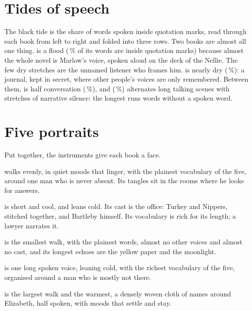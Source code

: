\clearpage
\section{Tides of speech}


\noindent The black tide is the share of words spoken inside quotation marks,
read through each book from left to right and folded into three rows. Two
books are almost all one thing.  is a flood
(\,\% of its words are inside quotation marks)
because almost the whole novel is Marlow's voice, spoken aloud on the deck of
the Nellie. The few dry stretches are the unnamed listener who frames him.
 is nearly dry (\,\%): a
journal, kept in secret, where other people's voices are only remembered.
Between them,  is half conversation
(\,\%), and 
(\,\%) alternates long talking scenes with stretches
of narrative silence: the longest runs  words without a
spoken word.

\clearpage
\section{Five portraits}

Put together, the instruments give each book a face.

 walks evenly, in quiet moods that linger, with the plainest
vocabulary of the five, around one man who is never absent. Its tangles sit in
the rooms where he looks for answers.

 is short and cool, and leans cold. Its cast is the office:
Turkey and Nippers, stitched together, and Bartleby himself. Its vocabulary is
rich for its length; a lawyer narrates it.

 is the smallest walk, with the plainest words, almost no
other voices and almost no cast, and its longest echoes are the yellow paper
and the moonlight.

 is one long spoken voice, leaning cold, with the
richest vocabulary of the five, organised around a man who is mostly not there.

 is the largest walk and the warmest, a densely woven
cloth of names around Elizabeth, half spoken, with moods that settle and stay.
